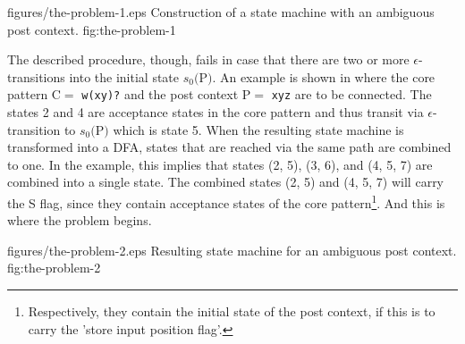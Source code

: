 \documentclass[acmtoplas]{acmtrans2m}
\newcommand{\pP}{{\sf P}}
\newcommand{\pC}{{\sf C}}
\begin{document}
\showpic
{figures/the-problem-1.eps}
{Construction of a state machine with an ambiguous post context.}
{fig:the-problem-1}

The described procedure, though, fails in case that there are two or more
$\epsilon$-transitions into the initial state $s_0($\pP$)$.  An example is
shown in  where the core pattern \pC $=$ {\tt w(xy)?} and the
post context \pP $=$ {\tt xyz} are to be connected. The states 2 and 4 are
    acceptance states in the core pattern and thus transit via
    $\epsilon$-transition to $s_0($\pP$)$ which is state 5. When the
    resulting state machine is transformed into a DFA, states that are reached
    via the same path are combined to one. In the example, this implies that
    states (2, 5), (3, 6), and (4, 5, 7) are combined into a single state. The
    combined states (2, 5) and (4, 5, 7) will carry the {\sf S} flag, since
    they contain acceptance states of the core pattern\footnote{Respectively,
        they contain the initial state of the post context, if this is to carry
            the 'store input position flag'.}. And this is where the problem
            begins.

\showpic
{figures/the-problem-2.eps}
{Resulting state machine for an ambiguous post context.}
{fig:the-problem-2}
\end{document}
